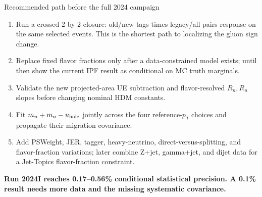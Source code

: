 \documentclass[aspectratio=169,10pt]{beamer}
\begin{document}
\begin{frame}{Recommended path before the full 2024 campaign}
\begin{enumerate}
\item Run a crossed 2-by-2 closure: old/new tags times legacy/all-pairs response on the same selected events. This is the shortest path to localizing the gluon sign change.
\item Replace fixed flavor fractions only after a data-constrained model exists; until then show the current IPF result as conditional on MC truth marginals.
\item Validate the new projected-area UE subtraction and flavor-resolved $R_n,R_u$ slopes before changing nominal HDM constants.
\item Fit $m_n+m_u-u_{\rm hole}$ jointly across the four reference-$p_T$ choices and propagate their migration covariance.
\item Add PSWeight, JER, tagger, heavy-neutrino, direct-versus-splitting, and flavor-fraction variations; later combine Z+jet, gamma+jet, and dijet data for a Jet-Topics flavor-fraction constraint.
\end{enumerate}
\vfill
\begin{center}
\color{cmsgreen}\textbf{Run 2024I reaches 0.17--0.56\% conditional statistical precision. A 0.1\% result needs more data and the missing systematic covariance.}
\end{center}
\end{frame}
\end{document}
